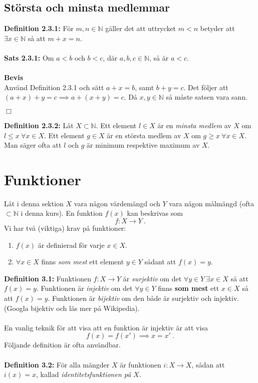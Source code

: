\documentclass{article}
\begin{document}
\subsection{Största och minsta medlemmar}
\textbf{Definition 2.3.1:} För $m,n\in\mathbb{N}$ gäller det att uttrycket $m<n$ betyder att $\exists x\in\mathbb{N}$ så att $m+x=n$.\\ \\
\textbf{Sats 2.3.1:} Om $a<b$ och $b<c$, där $a,b,c\in\mathbb{N}$, så är $a<c$.\\ \\
\textbf{Bevis}\\
Använd Definition 2.3.1 och sätt $a+x=b$, samt $b+y=c$. Det följer att $(a+x)+y=c\implies a+(x+y)=c$. Då $x,y\in\mathbb{N}$ så måste satsen vara sann.
\begin{flushright}
$\Box$
\end{flushright}
\textbf{Definition 2.3.2:} Låt $X\subset\mathbb{N}$. Ett element $l\in X$ är en \textit{minsta medlem} av $X$ om $l\leq x \ \forall x\in X$. Ett element $g\in X$ är en största medlem av $X$ om $g\geq x \ \forall x \in X$. Man säger ofta att $l$ och $g$ är minimum respektive maximum av $X$.
\section{Funktioner}
Låt i denna sektion $X$ vara någon värdemängd och $Y$ vara någon målmängd (ofta $\subset\mathbb{N}$ i denna kurs). En funktion $f(x)$ kan beskrivas som
$$
f:X\rightarrow Y \ .
$$
Vi har två (viktiga) krav på funktioner:
\begin{enumerate}%
    \item $f(x)$ är definierad för varje $x\in X$.
    \item $\forall x\in X$ finns \textit{som mest} ett element $y\in Y$ sådant att $f(x)=y$.
\end{enumerate}
\textbf{Definition 3.1:}
Funktionen $f:X\rightarrow Y$ är \textit{surjektiv} om det $\forall y\in Y \ \exists x\in X$ så att $f(x)=y$. Funktionen är \textit{injektiv} om det $\forall y\in Y$ finns \textbf{som mest} ett $x\in X$ så att $f(x)=y$. Funktionen är \textit{bijektiv} om den både är surjektiv och injektiv. (Googla bijektiv och läs mer på Wikipedia).
\\ \\

En vanlig teknik för att visa att en funktion är injektiv är att visa
$$
f(x)=f(x')\implies x=x' \ .
$$
Följande definition är ofta användbar.\\ \\
\textbf{Definition 3.2:} För alla mängder $X$ är funktionen $i:X\rightarrow X$, sådan att $i(x)=x$, kallad \textit{identitetsfunktionen på} $X$.
\end{document}
